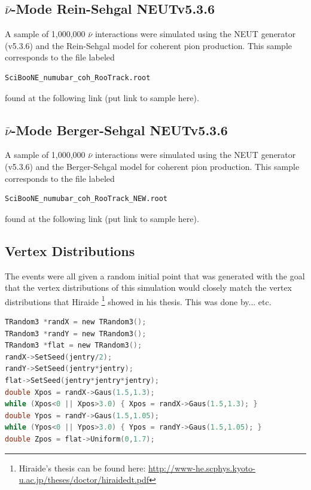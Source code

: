 \documentclass[11pt]{article}
\begin{document}
\subsection{$\bar{\nu}$-Mode Rein-Sehgal NEUTv5.3.6}
A sample of 1,000,000 $\bar{\nu}$ interactions were simulated using the NEUT generator (v5.3.6) and the Rein-Sehgal model for coherent pion production. This sample corresponds to the file labeled
\begin{verbatim}
SciBooNE_numubar_coh_RooTrack.root
\end{verbatim}
found at the following link (put link to sample here).

\subsection{$\bar{\nu}$-Mode Berger-Sehgal NEUTv5.3.6}
A sample of 1,000,000 $\bar{\nu}$ interactions were simulated using the NEUT generator (v5.3.6) and the Berger-Sehgal model for coherent pion production. This sample corresponds to the file labeled
\begin{verbatim}
SciBooNE_numubar_coh_RooTrack_NEW.root
\end{verbatim}
found at the following link (put link to sample here).




\subsection{Vertex Distributions}
The events were all given a random initial point that was generated with the goal that the vertex distributions of this simulation would closely match the vertex distributions that Hiraide \footnote{Hiraide's thesis can be found here: \href{http://www-he.scphys.kyoto-u.ac.jp/theses/doctor/hiraide_dt.pdf}{http://www-he.scphys.kyoto-u.ac.jp/theses/doctor/hiraide\textunderscore{}dt.pdf}} showed in his thesis. This was done by... etc.

\begin{lstlisting}[language=C]
TRandom3 *randX = new TRandom3();
TRandom3 *randY = new TRandom3();
TRandom3 *flat = new TRandom3();
randX->SetSeed(jentry/2);
randY->SetSeed(jentry*jentry);
flat->SetSeed(jentry*jentry*jentry);
double Xpos = randX->Gaus(1.5,1.3);
while (Xpos<0 || Xpos>3.0) { Xpos = randX->Gaus(1.5,1.3); }
double Ypos = randY->Gaus(1.5,1.05);
while (Ypos<0 || Ypos>3.0) { Ypos = randY->Gaus(1.5,1.05); }
double Zpos = flat->Uniform(0,1.7);
\end{lstlisting}
\end{document}
